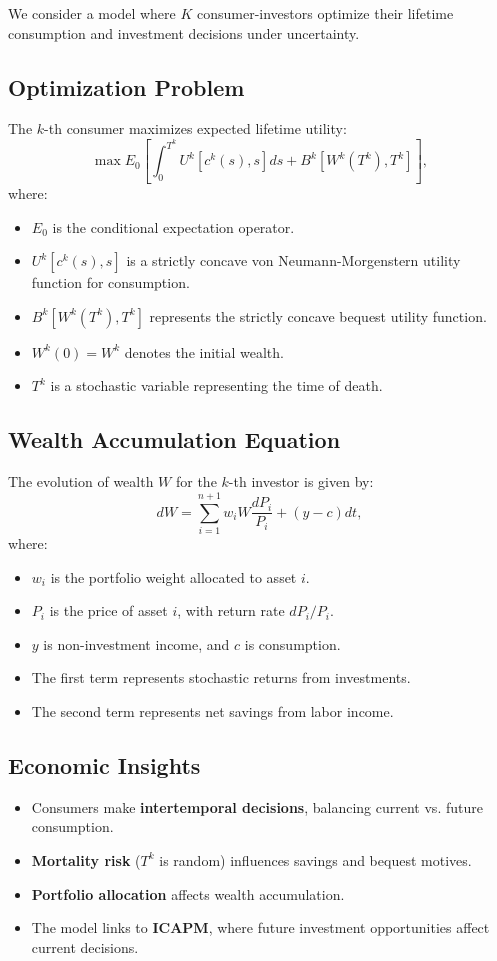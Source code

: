 \documentclass{article}
\begin{document}
We consider a model where $K$ consumer-investors optimize their lifetime consumption and investment decisions under uncertainty.

\subsection*{Optimization Problem}
The $k$-th consumer maximizes expected lifetime utility:
\[
\max E_0 \left[ \int_0^{T^k} U^k[c^k(s), s] ds + B^k[W^k(T^k), T^k] \right],
\]
where:
\begin{itemize}
    \item $E_0$ is the conditional expectation operator.
    \item $U^k[c^k(s), s]$ is a strictly concave von Neumann-Morgenstern utility function for consumption.
    \item $B^k[W^k(T^k), T^k]$ represents the strictly concave bequest utility function.
    \item $W^k(0) = W^k$ denotes the initial wealth.
    \item $T^k$ is a stochastic variable representing the time of death.
\end{itemize}

\subsection*{Wealth Accumulation Equation}
The evolution of wealth $W$ for the $k$-th investor is given by:
\[
dW = \sum_{i=1}^{n+1} w_i W \frac{dP_i}{P_i} + (y - c) dt,
\]
where:
\begin{itemize}
    \item $w_i$ is the portfolio weight allocated to asset $i$.
    \item $P_i$ is the price of asset $i$, with return rate $dP_i / P_i$.
    \item $y$ is non-investment income, and $c$ is consumption.
    \item The first term represents stochastic returns from investments.
    \item The second term represents net savings from labor income.
\end{itemize}

\subsection*{Economic Insights}
\begin{itemize}
    \item Consumers make \textbf{intertemporal decisions}, balancing current vs. future consumption.
    \item \textbf{Mortality risk} ($T^k$ is random) influences savings and bequest motives.
    \item \textbf{Portfolio allocation} affects wealth accumulation.
    \item The model links to \textbf{ICAPM}, where future investment opportunities affect current decisions.
\end{itemize}
\end{document}
